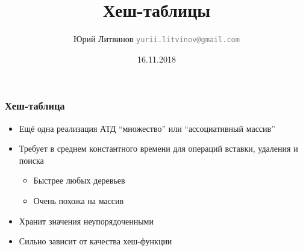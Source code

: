 \documentclass[xetex,mathserif,serif]{beamer}
\title{Хеш-таблицы}
\author[Юрий Литвинов]{Юрий Литвинов \newline \textcolor{gray}{\small\texttt{yurii.litvinov@gmail.com}}}
\date{16.11.2018}
\begin{document}
	
	\frame{\titlepage}

	\begin{frame}
		\frametitle{Хеш-таблица}
		\begin{itemize}
			\item Ещё одна реализация АТД ``множество'' или ``ассоциативный массив''
			\item Требует в среднем константного времени для операций вставки, удаления и поиска
			\begin{itemize}
				\item Быстрее любых деревьев
				\item Очень похожа на массив
			\end{itemize}
			\item Хранит значения неупорядоченными
			\item Сильно зависит от качества хеш-функции
		\end{itemize}
	\end{frame}
\end{document}
